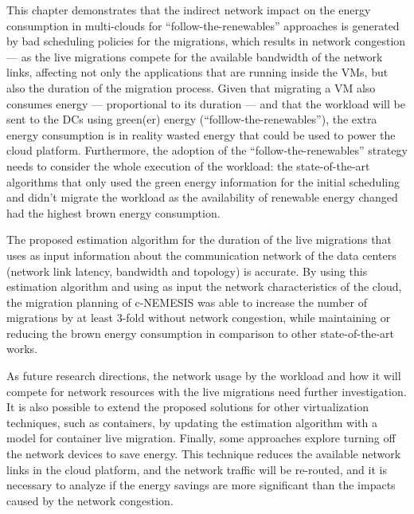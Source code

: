 This chapter demonstrates that the indirect network impact on the energy consumption in multi-clouds for ``follow-the-renewables'' approaches is generated by bad scheduling policies for the migrations, which results in network congestion --- as the live migrations compete for the available bandwidth of the network links, affecting not only the applications that are running inside the VMs, but also the duration of the migration process. Given that migrating a VM also consumes energy --- proportional to its duration --- and that the workload will be sent to the DCs using green(er) energy (``folllow-the-renewables''), the extra energy consumption is in reality wasted energy that could be used to power the cloud platform. Furthermore, the adoption of the ``follow-the-renewables'' strategy needs to consider the whole execution of the workload:  the state-of-the-art algorithms that only used the green energy information for the initial scheduling and didn't migrate the workload as the availability of renewable energy changed had the highest brown energy consumption.

The proposed estimation algorithm for the duration of the live migrations that uses as input information about the communication network of the data centers (network link latency, bandwidth and topology) is accurate. By using this estimation algorithm and using as input the network characteristics of the cloud, the migration planning of c-NEMESIS was able to increase the number of migrations by at least 3-fold without network congestion, while maintaining or reducing the brown energy consumption in comparison to other state-of-the-art works.

As future research directions, the network usage by the workload and how it will compete for network resources with the live migrations need further investigation. It is also possible to extend the proposed solutions for other virtualization techniques, such as containers, by updating the estimation algorithm with a model for container live migration. Finally, some approaches explore turning off the network devices to save energy. This technique reduces the available network links in the cloud platform, and the network traffic will be re-routed, and it is necessary to analyze if the energy savings are more significant than the impacts caused by the network congestion.
